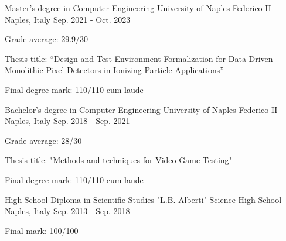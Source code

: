 

\begin{cventries}

  \cventry
    {Master's degree in Computer Engineering} %
    {University of Naples Federico II} %
    {Naples, Italy} %
    {Sep. 2021 - Oct. 2023} %
    {
      \begin{cvitems} %
        \item {Grade average: 29.9/30}
        \item {Thesis title: “Design and Test Environment Formalization for Data-Driven Monolithic Pixel Detectors in Ionizing Particle Applications”}
        \item {Final degree mark: 110/110 cum laude}
      \end{cvitems}
    }
  \cventry
    {Bachelor's degree in Computer Engineering}
    {University of Naples Federico II}
    {Naples, Italy}
    {Sep. 2018 - Sep. 2021}
    {
      \begin{cvitems}
          \item {Grade average: 28/30}
          \item {Thesis title: "Methods and techniques for Video Game Testing"}
          \item {Final degree mark: 110/110 cum laude}
      \end{cvitems}
    }
  \cventry
    {High School Diploma in Scientific Studies}
    {"L.B. Alberti" Science High School}
    {Naples, Italy}
    {Sep. 2013 - Sep. 2018}
    {
      \begin{cvitems}
          \item {Final mark: 100/100}
      \end{cvitems}
    }
\end{cventries}
